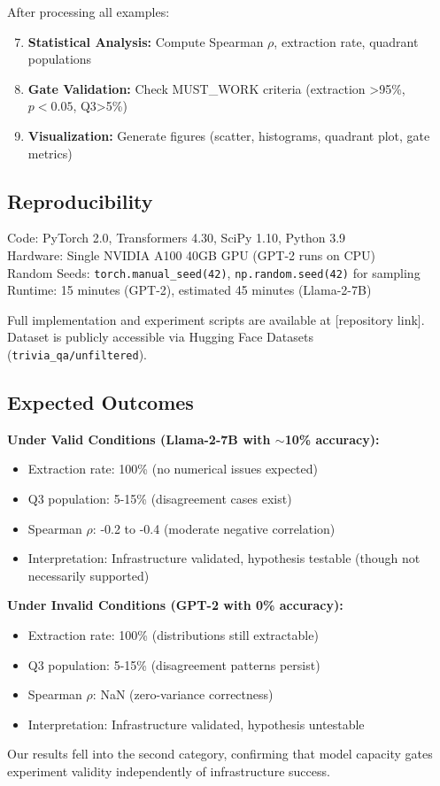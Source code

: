 After processing all examples:

\begin{enumerate}
\setcounter{enumi}{6}
\item \textbf{Statistical Analysis:} Compute Spearman $\rho$, extraction rate, quadrant populations
\item \textbf{Gate Validation:} Check MUST\_WORK criteria (extraction >95\%, $p<0.05$, Q3>5\%)
\item \textbf{Visualization:} Generate figures (scatter, histograms, quadrant plot, gate metrics)
\end{enumerate}

\subsection{Reproducibility}

Code: PyTorch 2.0, Transformers 4.30, SciPy 1.10, Python 3.9\\
Hardware: Single NVIDIA A100 40GB GPU (GPT-2 runs on CPU)\\
Random Seeds: \texttt{torch.manual\_seed(42)}, \texttt{np.random.seed(42)} for sampling\\
Runtime: 15 minutes (GPT-2), estimated 45 minutes (Llama-2-7B)

Full implementation and experiment scripts are available at [repository link]. Dataset is publicly accessible via Hugging Face Datasets (\texttt{trivia\_qa/unfiltered}).

\subsection{Expected Outcomes}

\textbf{Under Valid Conditions (Llama-2-7B with $\sim$10\% accuracy):}
\begin{itemize}
\item Extraction rate: 100\% (no numerical issues expected)
\item Q3 population: 5-15\% (disagreement cases exist)
\item Spearman $\rho$: -0.2 to -0.4 (moderate negative correlation)
\item Interpretation: Infrastructure validated, hypothesis testable (though not necessarily supported)
\end{itemize}

\textbf{Under Invalid Conditions (GPT-2 with 0\% accuracy):}
\begin{itemize}
\item Extraction rate: 100\% (distributions still extractable)
\item Q3 population: 5-15\% (disagreement patterns persist)
\item Spearman $\rho$: NaN (zero-variance correctness)
\item Interpretation: Infrastructure validated, hypothesis untestable
\end{itemize}

Our results fell into the second category, confirming that model capacity gates experiment validity independently of infrastructure success.
